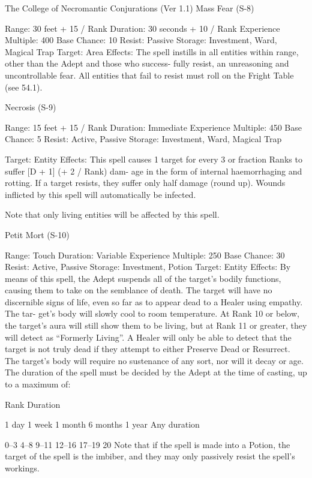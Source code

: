 \begin{Chapter}{The College of Necromantic Conjurations (Ver 1.1)}
Mass Fear (S-8) 

Range: 30 feet + 15 / Rank 
Duration: 30 seconds + 10 / Rank 
Experience Multiple: 400 
Base Chance: 10%
Resist: Passive 
Storage: Investment, Ward, Magical Trap 
Target: Area 
Effects:  The  spell  instills  in  all  entities  within 
range, other than the Adept and those who success-
fully resist, an unreasoning and uncontrollable fear. 
All entities that fail to resist must roll on the Fright 
Table (see 54.1). 

Necrosis (S-9) 

Range: 15 feet + 15 / Rank 
Duration: Immediate 
Experience Multiple: 450 
Base Chance: 5%
Resist: Active, Passive 
Storage: Investment, Ward, Magical Trap 

Target: Entity 
Effects:  This  spell  causes  1  target  for  every  3  or 
fraction Ranks to suffer [D + 1] (+ 2 / Rank) dam-
age  in  the  form  of  internal  haemorrhaging  and 
rotting.  If  a  target  resists,  they  suffer  only  half 
damage (round up). Wounds inflicted by this spell 
will automatically be infected. 

Note  that  only  living  entities  will  be  affected  by 
this spell. 

Petit Mort (S-10) 

Range: Touch 
Duration: Variable 
Experience Multiple: 250 
Base Chance: 30%
Resist: Active, Passive 
Storage: Investment, Potion 
Target: Entity 
Effects: By means of this spell, the Adept suspends 
all of the target’s bodily functions, causing them to 
take  on  the  semblance  of  death.  The  target  will 
have  no  discernible  signs  of  life,  even  so  far  as  to 
appear  dead  to  a  Healer  using  empathy.  The  tar-
get’s  body  will  slowly  cool  to  room  temperature. 
At  Rank  10  or  below,  the  target’s  aura  will  still 
show them to be living, but at Rank 11 or greater, 
they  will  detect  as  “Formerly  Living”.  A  Healer 
will  only  be  able  to  detect  that  the  target  is  not 
truly  dead  if  they  attempt  to  either  Preserve  Dead 
or  Resurrect.  The  target’s  body  will  require  no 
sustenance of any sort, nor will it decay or age. The 
duration of the spell must be decided by the Adept 
at the time of casting, up to a maximum of: 

Rank  Duration 

1 day 
1 week 
1 month 
6 months 
1 year 
Any duration 

0–3 
4–8 
9–11 
12–16 
17–19 
20 
Note  that  if  the  spell  is  made  into  a  Potion,  the 
target of the spell is the imbiber, and they may only 
passively resist the spell’s workings. 


\end{Chapter}
